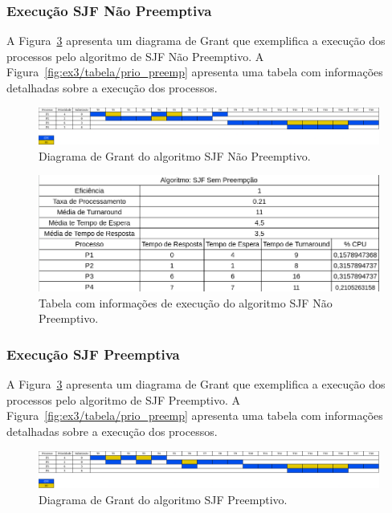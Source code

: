 \documentclass[
	12pt,				%
	oneside,   	        %
	a4paper,			%
	english,			%
	french,				%
	spanish,			%
	brazil,				%
	]{pacotes/abntex2}
\begin{document}
\subsubsection{Execução SJF Não Preemptiva}
\label{subsubsec:sjf_sem_preemp}

A Figura~\ref{fig:ex3/diagrama/sjf_sem_preemp} apresenta um diagrama de Grant que exemplifica a execução dos processos pelo algoritmo de SJF Não Preemptivo. A Figura~\ref{fig:ex3/tabela/prio_preemp} apresenta uma tabela com informações detalhadas sobre a execução dos processos.

\begin{figure}[H]
  \centering
  \includegraphics[scale=0.20]{figuras/ex3/diagrama/sjf_sem_preemp.png}
  \caption{Diagrama de Grant do algoritmo SJF Não Preemptivo.}
  \label{fig:ex3/diagrama/sjf_sem_preemp}
\end{figure}

\begin{figure}[H]
  \centering
  \includegraphics[scale=0.5]{figuras/ex3/tabela/sjf_sem_preemp.png}
  \caption{Tabela com informações de execução do algoritmo SJF Não Preemptivo.}
  \label{fig:ex3/tabela/sjf_sem_preemp}
\end{figure}

\subsubsection{Execução SJF Preemptiva}
\label{subsubsec:sjf_preemp}

A Figura~\ref{fig:ex3/diagrama/sjf_sem_preemp} apresenta um diagrama de Grant que exemplifica a execução dos processos pelo algoritmo de SJF Preemptivo. A Figura~\ref{fig:ex3/tabela/prio_preemp} apresenta uma tabela com informações detalhadas sobre a execução dos processos.

\begin{figure}[H]
  \centering
  \includegraphics[scale=0.20]{figuras/ex3/diagrama/sjf_preemp.png}
  \caption{Diagrama de Grant do algoritmo SJF Preemptivo.}
  \label{fig:ex3/diagrama/sjf_sem_preemp}
\end{figure}
\end{document}
